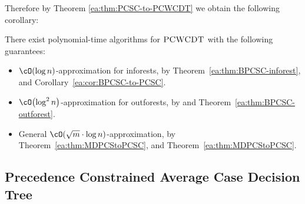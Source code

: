 Therefore by Theorem \ref{ea:thm:PCSC-to-PCWCDT} we obtain the following corollary:
\begin{corollary}\label{ea:cor:PCWCDT-special-cases}
    There exist polynomial-time algorithms for $\textup{\textsc{PCWCDT}}$ with the following guarantees:
    \begin{itemize}
        \item $\cO\br{\log n}$-approximation for inforests, by Theorem~\ref{ea:thm:BPCSC-inforest}, and Corollary~\ref{ea:cor:BPCSC-to-PCSC}.
        \item $\cO\br{\log^2n}$-approximation for outforests, by and Theorem~\ref{ea:thm:BPCSC-outforest}.
        \item General $\cO\br{\sqrt{m}\cdot\log n}$-approximation, by Theorem~\ref{ea:thm:MDPCStoPCSC}, and Theorem~\ref{ea:thm:MDPCStoPCSC}.
    \end{itemize}
\end{corollary}



\subsection{Precedence Constrained Average Case Decision Tree} \label{ea:subsection:PCACDT}


